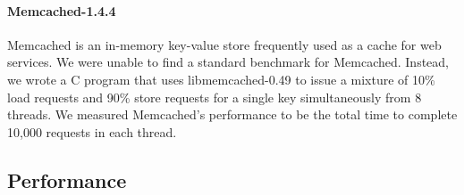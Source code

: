 \documentclass[preprint,9pt]{sigplanconf}
\newcommand{\addtodo}[1]{\textcolor{red}{[To do: #1]}}
\begin{document}
\paragraph{Memcached-1.4.4}
Memcached is an in-memory key-value store frequently used as a cache for web
services.  We were unable to find a standard benchmark for Memcached.  Instead,
we wrote a C program that uses libmemcached-0.49 to issue a
mixture of 10\% load requests and 90\% store requests for a single key 
simultaneously from 8 threads.  We measured Memcached's performance to be the
total time to complete 10,000 requests in each thread.


%


\subsection{Performance}
\label{sec:eval:perf}
\end{document}
